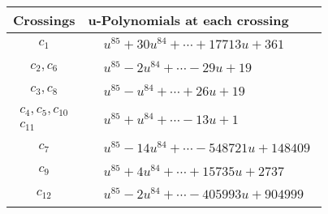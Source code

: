 \documentclass[1p]{elsarticle_modified}
\theoremstyle{definition}
\begin{document}
\begin{tabular}{m{50pt}|m{274pt}}
Crossings & \hspace{64pt}u-Polynomials at each crossing \\
\hline $$\begin{aligned}c_{1}\end{aligned}$$&$\begin{aligned}
&u^{85}+30 u^{84}+\cdots+17713 u+361
\end{aligned}$\\
\hline $$\begin{aligned}c_{2},c_{6}\end{aligned}$$&$\begin{aligned}
&u^{85}-2 u^{84}+\cdots-29 u+19
\end{aligned}$\\
\hline $$\begin{aligned}c_{3},c_{8}\end{aligned}$$&$\begin{aligned}
&u^{85}- u^{84}+\cdots+26 u+19
\end{aligned}$\\
\hline $$\begin{aligned}c_{4},c_{5},c_{10}\\c_{11}\end{aligned}$$&$\begin{aligned}
&u^{85}+u^{84}+\cdots-13 u+1
\end{aligned}$\\
\hline $$\begin{aligned}c_{7}\end{aligned}$$&$\begin{aligned}
&u^{85}-14 u^{84}+\cdots-548721 u+148409
\end{aligned}$\\
\hline $$\begin{aligned}c_{9}\end{aligned}$$&$\begin{aligned}
&u^{85}+4 u^{84}+\cdots+15735 u+2737
\end{aligned}$\\
\hline $$\begin{aligned}c_{12}\end{aligned}$$&$\begin{aligned}
&u^{85}-2 u^{84}+\cdots-405993 u+904999
\end{aligned}$\\
\hline
\end{tabular}\\~\\
\end{document}
